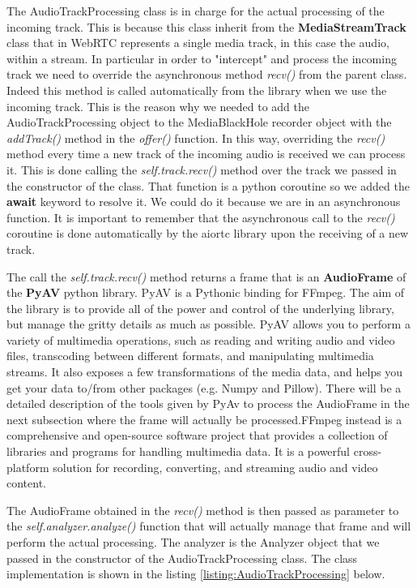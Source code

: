 \documentclass[../main.tex]{subfiles}
\begin{document}
The AudioTrackProcessing class is in charge for the actual processing of the incoming track. This is because this class inherit from the \textbf{MediaStreamTrack} class that in WebRTC represents a single media track, in this case the audio, within a stream. In particular in order to "intercept" and process the incoming track we need to override the asynchronous method \textit{recv()} from the parent class. Indeed this method is called automatically from the library when we use the incoming track. This is the reason why we needed to add the AudioTrackProcessing object to the MediaBlackHole recorder object with the \textit{addTrack()} method in the \textit{offer()} function. In this way, overriding the \textit{recv()} method every time a new track of the incoming audio is received we can process it. This is done calling the \textit{self.track.recv()} method over the track we passed in the constructor of the class. That function is a python coroutine so we added the \textbf{await} keyword to resolve it. We could do it because we are in an asynchronous function. It is important to remember that the asynchronous call to the \textit{recv()} coroutine is done automatically by the aiortc library upon the receiving of a new track. 

The call the \textit{self.track.recv()} method returns a frame that is an \textbf{AudioFrame} of the \textbf{PyAV} python library. PyAV is a Pythonic binding for FFmpeg. The aim of the library is to provide all of the power and control of the underlying library, but manage the gritty details as much as possible. PyAV allows you to perform a variety of multimedia operations, such as reading and writing audio and video files, transcoding between different formats, and manipulating multimedia streams. It also exposes a few transformations of the media data, and helps you get your data to/from other packages (e.g. Numpy and Pillow). There will be a detailed description of the tools given by PyAv to process the AudioFrame in the next subsection where the frame will actually be processed.FFmpeg instead is a comprehensive and open-source software project that provides a collection of libraries and programs for handling multimedia data. It is a powerful cross-platform solution for recording, converting, and streaming audio and video content.

The AudioFrame obtained in the \textit{recv()} method is then passed as parameter to the \textit{self.analyzer.analyze()} function that will actually manage that frame and will perform the actual processing. The analyzer is the Analyzer object that we passed in the constructor of the AudioTrackProcessing class. The class implementation is shown in the listing \ref{listing:AudioTrackProcessing} below.
\end{document}
